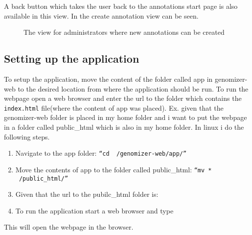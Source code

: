 A back button which takes the user back to the annotations start page is also available in this view. In  the create annotation view can be seen.

\begin{figure}[t]
 \caption{The view for administrators where new annotations can be created}
 \label{adm_web_createView}
\end{figure}

\subsection{Setting up the application}
To setup the application, move the content of the folder called app in genomizer-web to the desired location from where the application should be run. To run the webpage open a web browser and enter the url to the folder which contains the \texttt{index.html} file(where the content of app was placed).
Ex. given that the genomizer-web folder is placed in my home folder and i want to put the webpage in a folder called public\_html which is also in my home folder. In linux i do the following steps.
\begin{enumerate}
	\item Navigate to the app folder: \texttt{“cd ~/genomizer-web/app/”}
	\item Move the contents of app to the folder called public\_html: \texttt{“mv * ~/public\_html/”}
	\item Given that the url to the pubilc\_html folder is: 
	\item To run the application start a web browser and type 
\end{enumerate}
This will open the webpage in the browser.


